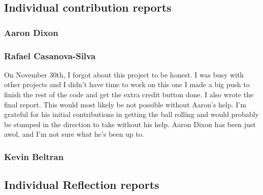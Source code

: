 \documentclass[11pt]{article}
\begin{document}
\subsection{Individual contribution reports}

\subsubsection{Aaron Dixon}
\subsubsection{Rafael Casanova-Silva}
On November 30th, I forgot about this project to be honest. I was busy with other projects and I didn't have time to work on this one
I made a big push to finish the rest of the code and get the extra credit button done. I also wrote the final report. This would most likely
be not possible without Aaron's help. I'm grateful for his initial contributions in getting the ball rolling and would probably be stumped in
the direction to take without his help. Aaron Dixon has been just awol, and I'm not sure what he's been up to.
\subsubsection{Kevin Beltran}

\subsection{Individual Reflection reports}
\end{document}

